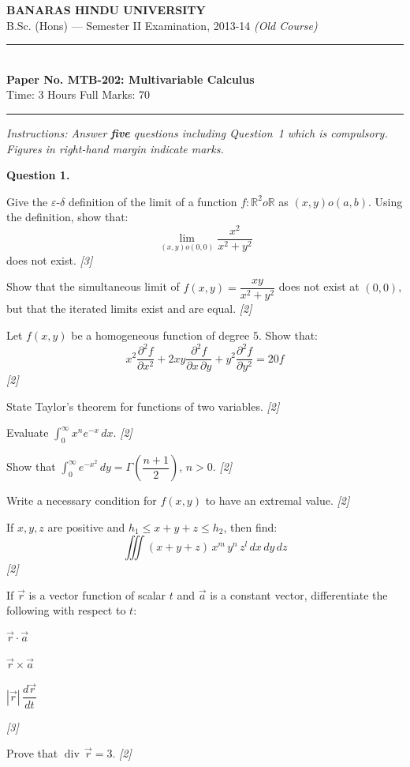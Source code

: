 \documentclass[11pt,a4paper]{article}
\newcommand{\pts}[1]{\hfill   \textit{[#1]}}
\begin{document}
\begin{center}
  {\large\bfseries BANARAS HINDU UNIVERSITY}\\[2pt]
  {\normalsize B.Sc. (Hons) --- Semester II Examination, 2013-14   \textit{(Old Course)}}\\[6pt]
  \rule{0.8\linewidth}{0.5pt}\\[6pt]
  {\large\bfseries Paper No. MTB-202: Multivariable Calculus}\\[4pt]
  {\normalsize Time: 3 Hours \hfill Full Marks: 70}
\end{center}
\rule{\linewidth}{0.4pt}
\smallskip



\noindent   \textit{Instructions: Answer   \textbf{five} questions including Question~1 which is compulsory. Figures in right-hand margin indicate marks.}
\bigskip




\noindent   \textbf{Question 1.}

\begin{parts}
  \item Give the $\varepsilon$-$\delta$ definition of the limit of a function $f:\mathbb{R}^2 o\mathbb{R}$ as $(x,y) o(a,b)$. Using the definition, show that:
  \[
  \lim_{(x,y) o(0,0)} \frac{x^2}{x^2+y^2}
  \]
  does not exist. \pts{3}
  \item Show that the simultaneous limit of $f(x,y) = \dfrac{xy}{x^2+y^2}$ does not exist at $(0,0)$, but that the iterated limits exist and are equal. \pts{2}
  \item Let $f(x,y)$ be a homogeneous function of degree $5$. Show that:
  \[
  x^2\frac{\partial^2 f}{\partial x^2} + 2xy\frac{\partial^2 f}{\partial x\,\partial y} + y^2\frac{\partial^2 f}{\partial y^2} = 20f
  \] \pts{2}
  \item State Taylor's theorem for functions of two variables. \pts{2}
  \item Evaluate $\int_0^\infty x^n e^{-x}\,dx$. \pts{2}
  \item Show that $\int_0^\infty e^{-x^2}\,dy = \Gamma\!\left(\dfrac{n+1}{2}\right)$, $n > 0$. \pts{2}
  \item Write a necessary condition for $f(x,y)$ to have an extremal value. \pts{2}
  \item If $x, y, z$ are positive and $h_1 \le x + y + z \le h_2$, then find:
  \[
  \iiint (x+y+z)\,x^m\,y^n\,z^l\,dx\,dy\,dz
  \] \pts{2}
  \item If $\vec{r}$ is a vector function of scalar $t$ and $\vec{a}$ is a constant vector, differentiate the following with respect to $t$:
  
\begin{parts}
    \item $\vec{r} \cdot \vec{a}$
    \item $\vec{r}  \times \vec{a}$
    \item $|\vec{r}|\,\dfrac{d\vec{r}}{dt}$
  \end{parts} \pts{3}
  \item Prove that $\operatorname{div}\,\vec{r} = 3$. \pts{2}
\end{parts}
\end{document}
